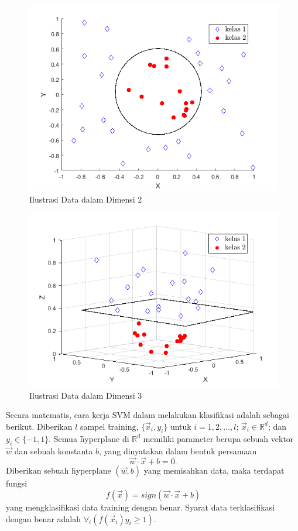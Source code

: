   \begin{figure}
    \centering
    \includegraphics[width=\linewidth]{pics/svm_2db}
    \caption{Ilustrasi Data dalam Dimensi 2}
    \label{fig:svm2d}
  \end{figure}

  \begin{figure}
    \centering
    \includegraphics[width=\linewidth]{pics/svm_3db}
    \caption{Ilustrasi Data dalam Dimensi 3}
    \label{fig:svm3d}
  \end{figure}

  Secara matematis, cara kerja SVM dalam melakukan klasifikasi adalah sebagai berikut. Diberikan $l$ sampel \f{training}, $\{\vec x_i,y_i\}$ untuk $i=1,2,\dots,l$; $\vec x_i\in\mathbb{R}^d$; dan $y_i\in\{-1,1\}$. Semua \f{hyperplane} di $\mathbb{R}^d$ memiliki parameter berupa sebuah vektor $\vec w$ dan sebuah konstanta $b$, yang dinyatakan dalam bentuk persamaan
  \begin{equation}
    \vec w\cdot\vec x+b=0.
  \end{equation}
  Diberikan sebuah \f{hyperplane} $(\vec w,b)$ yang memisahkan data, maka terdapat fungsi
  \begin{equation}
    f(\vec x) = sign(\vec w\cdot\vec x+b)
  \end{equation}
  yang mengklasifikasi data \f{training} dengan benar. Syarat data terklasifikasi dengan benar adalah $\forall_i(f(\vec x_i)y_i \geq 1)$.

